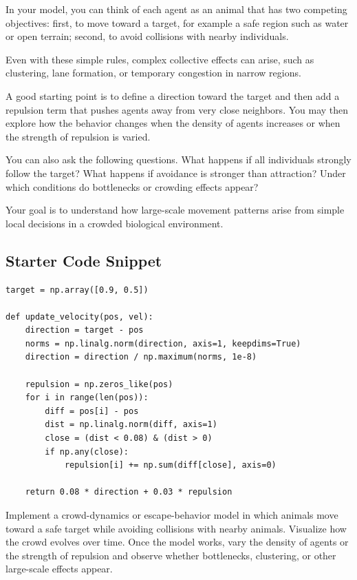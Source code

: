 \documentclass[paper=letter, fontsize=12pt]{article}
\numberwithin{equation}{section}
\begin{document}
In your model, you can think of each agent as an animal that has two competing objectives: first, to move toward a target, for example a safe region such as water or open terrain; second, to avoid collisions with nearby individuals.

Even with these simple rules, complex collective effects can arise, such as clustering, lane formation, or temporary congestion in narrow regions.

A good starting point is to define a direction toward the target and then add a repulsion term that pushes agents away from very close neighbors. You may then explore how the behavior changes when the density of agents increases or when the strength of repulsion is varied.

You can also ask the following questions. What happens if all individuals strongly follow the target? What happens if avoidance is stronger than attraction? Under which conditions do bottlenecks or crowding effects appear?

Your goal is to understand how large-scale movement patterns arise from simple local decisions in a crowded biological environment.

\subsection*{Starter Code Snippet}

\begin{lstlisting}
target = np.array([0.9, 0.5])

def update_velocity(pos, vel):
    direction = target - pos
    norms = np.linalg.norm(direction, axis=1, keepdims=True)
    direction = direction / np.maximum(norms, 1e-8)

    repulsion = np.zeros_like(pos)
    for i in range(len(pos)):
        diff = pos[i] - pos
        dist = np.linalg.norm(diff, axis=1)
        close = (dist < 0.08) & (dist > 0)
        if np.any(close):
            repulsion[i] += np.sum(diff[close], axis=0)

    return 0.08 * direction + 0.03 * repulsion
\end{lstlisting}

\begin{taskbox}
Implement a crowd-dynamics or escape-behavior model in which animals move toward a safe target while avoiding collisions with nearby animals. Visualize how the crowd evolves over time. Once the model works, vary the density of agents or the strength of repulsion and observe whether bottlenecks, clustering, or other large-scale effects appear.
\end{taskbox}
\end{document}
